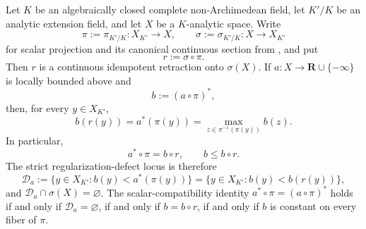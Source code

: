 
\begin{theorem}
\label{thm:p031-canonical-scalar-retraction-normal-form}
Let $K$ be an algebraically closed complete non-Archimedean field, let
$K'/K$ be an analytic extension field, and let $X$ be a $K$-analytic space.
Write
\[
 \pi:=\pi_{K'/K}:X_{K'}\longrightarrow X,
 \qquad
 \sigma:=\sigma_{K'/K}:X\longrightarrow X_{K'}
\]
for scalar projection and its canonical continuous section from
, and put
\[
                         r:=\sigma\circ\pi.
\]
Then $r$ is a continuous idempotent retraction onto $\sigma(X)$.  If
$a:X\to\mathbf R\cup\{-\infty\}$ is locally bounded above and
\[
                         b:=(a\circ\pi)^*,
\]
then, for every $y\in X_{K'}$,
\begin{equation}
\label{eq:p031-canonical-retraction-fiber-maximum}
 b(r(y))
   =a^*(\pi(y))
   =\max_{z\in\pi^{-1}(\pi(y))}b(z).
\end{equation}
In particular,
\begin{equation}
\label{eq:p031-canonical-retraction-regularization}
                    a^*\circ\pi=b\circ r,
                    \qquad b\leq b\circ r.
\end{equation}
The strict regularization-defect locus is therefore
\begin{equation}
\label{eq:p031-canonical-retraction-defect-locus}
 \mathcal D_a
   :=\{y\in X_{K'}:b(y)<a^*(\pi(y))\}
    =\{y\in X_{K'}:b(y)<b(r(y))\},
\end{equation}
and $\mathcal D_a\cap\sigma(X)=\varnothing$.  The scalar-compatibility
identity $a^*\circ\pi=(a\circ\pi)^*$ holds if and only if
$\mathcal D_a=\varnothing$, if and only if $b=b\circ r$, if and only if
$b$ is constant on every fiber of $\pi$.
\end{theorem}

